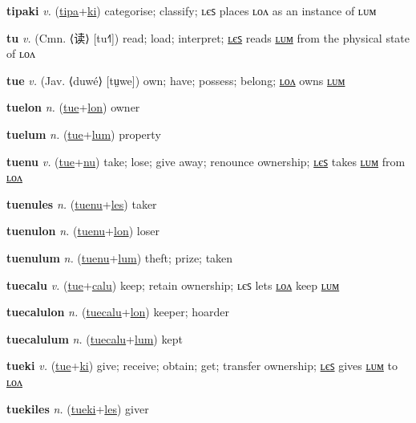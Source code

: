 \textbf{\hypertarget{tipaki}{tipaki}} \textit{v.} (\hyperlink{tipa}{tipa}+\allowbreak \hyperlink{ki}{ki})
categorise; classify; ʟєꜱ places ʟᴏᴧ as an instance of ʟᴜᴍ

\textbf{\hypertarget{tu}{tu}} \textit{v.} (Cmn. ⟨{\chinese{}读}⟩ [tu˧˥])
read; load; interpret; \hyperlink{tules}{ʟєꜱ} reads \hyperlink{tulum}{ʟᴜᴍ} from the physical state of ʟᴏᴧ

\textbf{\hypertarget{tue}{tue}} \textit{v.} (Jav. ⟨duwé⟩ [tṳwe])
own; have; possess; belong; \hyperlink{tuelon}{ʟᴏᴧ} owns \hyperlink{tuelum}{ʟᴜᴍ}

\textbf{\hypertarget{tuelon}{tuelon}} \textit{n.} (\hyperlink{tue}{tue}+\allowbreak \hyperlink{lon}{lon})
owner

\textbf{\hypertarget{tuelum}{tuelum}} \textit{n.} (\hyperlink{tue}{tue}+\allowbreak \hyperlink{lum}{lum})
property

\textbf{\hypertarget{tuenu}{tuenu}} \textit{v.} (\hyperlink{tue}{tue}+\allowbreak \hyperlink{nu}{nu})
take; lose; give away; renounce ownership; \hyperlink{tuenules}{ʟєꜱ} takes \hyperlink{tuenulum}{ʟᴜᴍ} from \hyperlink{tuenulon}{ʟᴏᴧ}

\textbf{\hypertarget{tuenules}{tuenules}} \textit{n.} (\hyperlink{tuenu}{tuenu}+\allowbreak \hyperlink{les}{les})
taker

\textbf{\hypertarget{tuenulon}{tuenulon}} \textit{n.} (\hyperlink{tuenu}{tuenu}+\allowbreak \hyperlink{lon}{lon})
loser

\textbf{\hypertarget{tuenulum}{tuenulum}} \textit{n.} (\hyperlink{tuenu}{tuenu}+\allowbreak \hyperlink{lum}{lum})
theft; prize; taken

\textbf{\hypertarget{tuecalu}{tuecalu}} \textit{v.} (\hyperlink{tue}{tue}+\allowbreak \hyperlink{calu}{calu})
keep; retain ownership; ʟєꜱ lets \hyperlink{tuecalulon}{ʟᴏᴧ} keep \hyperlink{tuecalulum}{ʟᴜᴍ}

\textbf{\hypertarget{tuecalulon}{tuecalulon}} \textit{n.} (\hyperlink{tuecalu}{tuecalu}+\allowbreak \hyperlink{lon}{lon})
keeper; hoarder

\textbf{\hypertarget{tuecalulum}{tuecalulum}} \textit{n.} (\hyperlink{tuecalu}{tuecalu}+\allowbreak \hyperlink{lum}{lum})
kept

\textbf{\hypertarget{tueki}{tueki}} \textit{v.} (\hyperlink{tue}{tue}+\allowbreak \hyperlink{ki}{ki})
give; receive; obtain; get; transfer ownership; \hyperlink{tuekiles}{ʟєꜱ} gives \hyperlink{tuekilum}{ʟᴜᴍ} to \hyperlink{tuekilon}{ʟᴏᴧ}

\textbf{\hypertarget{tuekiles}{tuekiles}} \textit{n.} (\hyperlink{tueki}{tueki}+\allowbreak \hyperlink{les}{les})
giver

